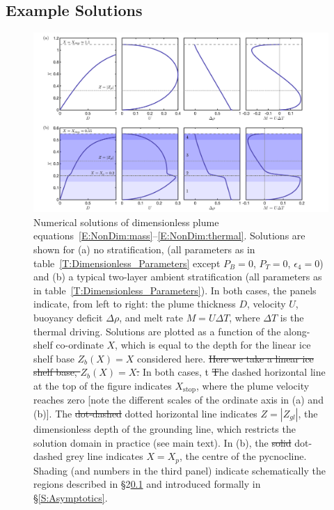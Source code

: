 \documentclass[openacc]{rsproca_new}%
\newcommand{\red}[1]{{\color{red} #1}}
\newcommand{\blue}[1]{{\color{blue} #1}}
\newcommand{\rout}[1]{\red{\st{#1}}}\newcommand{\ab}[1]{\textcolor{Green}{#1}}\newcommand{\about}[1]{\textcolor{Cyan}{\sout{#1}}}
\newcommand{\epsfour}{\epsilon_{4}}
\newcommand{\Pb}{\textit{P}_B}  %
\newcommand{\Pt}{\textit{P}_T}
\begin{document}
\subsection{Example Solutions}\label{S:ExampleSolutions}

\begin{figure}
\centering
\includegraphics[width = \textwidth]{./make_plots/plots/figure3.png}
\caption{Numerical solutions of dimensionless plume equations~\eqref{E:NonDim:mass}--\eqref{E:NonDim:thermal}. Solutions are shown for (a) no stratification, (all parameters as in table~\ref{T:Dimensionless_Parameters} except $\Pb = 0$, $\Pt = 0$, $\epsfour = 0$) and (b)  a typical two-layer ambient stratification (all parameters as in table~\ref{T:Dimensionless_Parameters}). \blue{In both cases, the panels indicate, from left to right: the plume thickness $D$, velocity $U$, buoyancy deficit $\Delta \rho$, and melt rate $M = U \Delta T$, where $\Delta T$ is the thermal driving. Solutions are plotted as a function of the along-shelf co-ordinate $X$, which is equal to the depth for the linear ice shelf base $Z_b(X) = X$ considered here.} \rout{Here we take a linear ice shelf base, $Z_b(X) = X$. }\blue{In both cases, t}\rout{T}he dashed horizontal line \blue{at the top of the figure} indicates $X_{\text{stop}}$, where the plume velocity reaches zero \blue{[note the different scales of the ordinate axis in (a) and (b)].} The \rout{dot-dashed} \blue{dotted} horizontal line indicates $Z = |Z_{gl}|$, the dimensionless depth of the grounding line, which restricts the solution domain in practice (see main text). In (b), the \rout{solid }\blue{dot-dashed} grey line indicates $X = X_p$, the centre of the pycnocline. Shading (and numbers in the third panel) indicate schematically the regions described in \S2\ref{S:ExampleSolutions} and introduced formally in \S\ref{S:Asymptotics}. }\label{fig:ExampleSols}
\end{figure}
\end{document}
